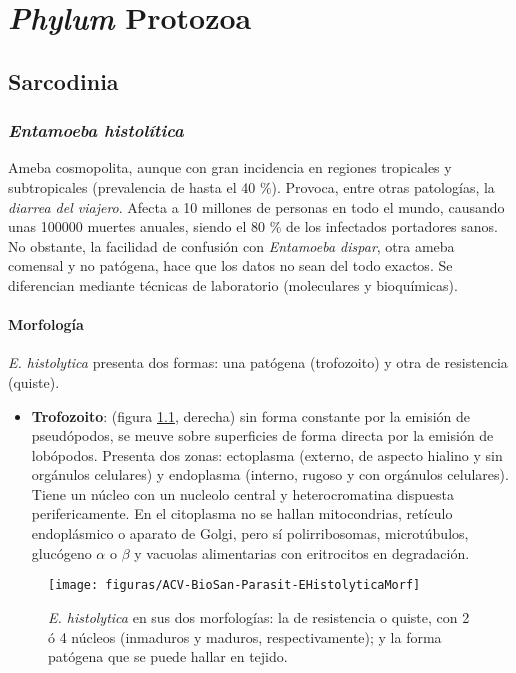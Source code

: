 \documentclass[10pt,a4paper,onecolumn,openany]{book}
\begin{document}
\chapter{\textit{Phylum} Protozoa}
\section{Sarcodinia}
\subsection{\textit{Entamoeba histolítica}}
Ameba cosmopolita, aunque con gran incidencia en regiones tropicales y subtropicales (prevalencia de hasta el 40 \%). Provoca, entre otras patologías, la \textit{diarrea del viajero}. Afecta a 10 millones de personas en todo el mundo, causando unas 100000 muertes anuales, siendo el 80 \% de los infectados portadores sanos. No obstante, la facilidad de confusión con \textit{Entamoeba dispar}, otra ameba comensal y no patógena, hace que los datos no sean del todo exactos. Se diferencian mediante técnicas de laboratorio (moleculares y bioquímicas).
\begin{multicols}{2}
	\subsubsection{Morfología}
	\textit{E. histolytica} presenta dos formas: una patógena (trofozoito) y otra de resistencia (quiste).
	\begin{itemize}[itemsep=0pt,parsep=0pt,topsep=0pt,partopsep=0pt]
		\item \textbf{Trofozoito}: (figura \ref{fig:PARASIT:EHistolyticaMorf}, derecha) sin forma constante por la emisión de pseudópodos, se meuve sobre superficies de forma directa por la emisión de lobópodos. Presenta dos zonas: ectoplasma (externo, de aspecto hialino y sin orgánulos celulares) y endoplasma (interno, rugoso y con orgánulos celulares). Tiene un núcleo con un nucleolo central y heterocromatina dispuesta perifericamente. En el citoplasma no se hallan mitocondrias, retículo endoplásmico o aparato de Golgi, pero sí polirribosomas, microtúbulos, glucógeno $\alpha \mbox{ o } \beta$ y vacuolas alimentarias con eritrocitos en degradación.
	\end{itemize}
	\columnbreak
	\begin{figure}[H]
		\centering
		\texttt{[image: figuras/ACV-BioSan-Parasit-EHistolyticaMorf]}
		\caption{\textit{E. histolytica} en sus dos morfologías: la de resistencia o quiste, con 2 ó 4 núcleos (inmaduros y maduros, respectivamente); y la forma patógena que se puede hallar en tejido.\label{fig:PARASIT:EHistolyticaMorf}}
	\end{figure}
\end{multicols}
\end{document}
